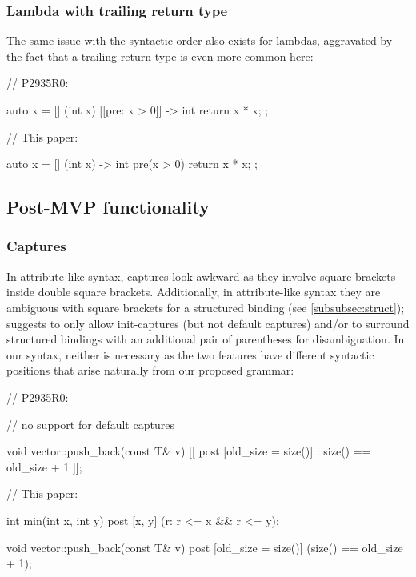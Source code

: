 \subsubsection{Lambda with trailing return type}
The same issue with the syntactic order also exists for lambdas, aggravated by the fact that a trailing return type is even more common here:
\vspace{3mm}

\begin{minipage}{8cm}
\begin{codeblock}
// P2935R0:

auto x = [] (int x)
  [[pre: x > 0]] -> int
{ 
  return x * x; 
};
\end{codeblock}
\end{minipage}
\begin{minipage}{8cm}
\begin{codeblock}
// This paper:

auto x = [] (int x) -> int 
  pre(x > 0)
{ 
  return x * x; 
};
\end{codeblock}
\end{minipage}

\subsection{Post-MVP functionality}

\subsubsection{Captures}
\label{subsubsec:comp_captures}

In attribute-like syntax, captures look awkward as they involve square brackets inside double square brackets. Additionally, in attribute-like syntax they are ambiguous with square brackets for a structured binding (see \ref{subsubsec:struct}); \cite{P2935R0} suggests to only allow init-captures (but not default captures) and/or to surround structured bindings with an additional pair of parentheses for disambiguation. In our syntax, neither is necessary as the two features have different syntactic positions that arise naturally from our proposed grammar:

\begin{minipage}[t]{8cm}
\begin{codeblock}
// P2935R0:

// no support for default captures


void vector::push_back(const T& v)
  [[ post [old_size = size()]
    : size() == old_size + 1 ]];
    
\end{codeblock}
\end{minipage}
\begin{minipage}[t]{8cm}
\begin{codeblock}
// This paper:
    
int min(int x, int y)
  post [x, y] (r: r <= x && r <= y);
  
void vector::push_back(const T& v)
  post [old_size = size()] 
    (size() == old_size + 1);
\end{codeblock}
\end{minipage}

